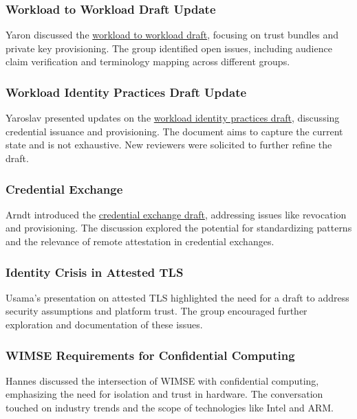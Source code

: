 \documentclass{article}
\begin{document}
\subsubsection{Workload to Workload Draft Update}
Yaron discussed the \href{https://datatracker.ietf.org/doc/draft-ietf-wimse-s2s-protocol/03/}{workload to workload draft}, focusing on trust bundles and private key provisioning. The group identified open issues, including audience claim verification and terminology mapping across different groups.

\subsubsection{Workload Identity Practices Draft Update}
Yaroslav presented updates on the \href{https://datatracker.ietf.org/doc/draft-ietf-wimse-workload-identity-practices/}{workload identity practices draft}, discussing credential issuance and provisioning. The document aims to capture the current state and is not exhaustive. New reviewers were solicited to further refine the draft.

\subsubsection{Credential Exchange}
Arndt introduced the \href{https://datatracker.ietf.org/doc/draft-schwenkschuster-wimse-credential-exchange/}{credential exchange draft}, addressing issues like revocation and provisioning. The discussion explored the potential for standardizing patterns and the relevance of remote attestation in credential exchanges.

\subsubsection{Identity Crisis in Attested TLS}
Usama's presentation on attested TLS highlighted the need for a draft to address security assumptions and platform trust. The group encouraged further exploration and documentation of these issues.

\subsubsection{WIMSE Requirements for Confidential Computing}
Hannes discussed the intersection of WIMSE with confidential computing, emphasizing the need for isolation and trust in hardware. The conversation touched on industry trends and the scope of technologies like Intel and ARM.
\end{document}
